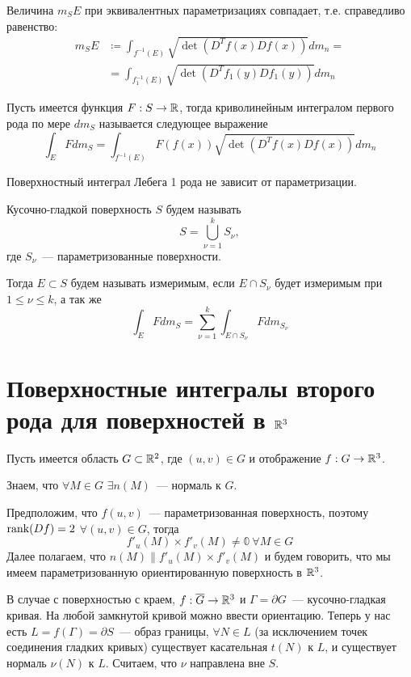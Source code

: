 \documentclass[main]{subfiles}
\begin{document}
\begin{theorem}
    Величина $m_S E$ при эквивалентных параметризациях совпадает, т.е. справедливо равенство:
    \begin{align*}
        m_S E & \coloneq \int_{f^{-1}(E)} \sqrt{\det(D^Tf(x) Df(x))} dm_n = \\
              & = \int_{f_1^{-1}(E)} \sqrt{\det(D^Tf_1(y) Df_1(y))} dm_n
    \end{align*}
\end{theorem}

\begin{definition}
    Пусть имеется функция $F: S \to \mathbb{R}$, тогда криволинейным интегралом первого рода по мере $dm_S$ называется следующее выражение
    \[\int_E F dm_S = \int_{f^{-1}(E)} F(f(x)) \sqrt{\det(D^Tf(x) Df(x))} dm_n\]
\end{definition}
\begin{theorem}
    Поверхностный интеграл Лебега 1 рода не зависит от параметризации.
\end{theorem}

\begin{definition}
    Кусочно-гладкой поверхность $S$ будем называть
    \[S = \bigcup_{\nu = 1}^k S_\nu,\]
    где $S_\nu$~--- параметризованные поверхности.

    Тогда $E \subset S$ будем называть измеримым, если $E \cap S_\nu$ будет измеримым при $1 \le \nu \le k$, а так же
    \[\int_E F dm_S = \sum_{\nu = 1}^{k} \int_{E \cap S_\nu} F dm_{S_\nu}\]
\end{definition}

\section{Поверхностные интегралы второго рода для поверхностей в \texorpdfstring{$\mathbb{R}^3$}{R\textasciicircum 3}}
\begin{definition}
    Пусть имеется область $G \subset \mathbb{R}^2$, где $(u, v) \in G$ и отображение $f: G \to \mathbb{R}^3$.

    Знаем, что $\forall M \in G$ $\exists n(M)$~--- нормаль к $G$.

    Предположим, что $f(u, v)$~--- параметризованная поверхность, поэтому $\operatorname{rank}(Df) = 2$ $\forall (u, v) \in G$, тогда
    \[f'_u(M) \times f'_v(M) \neq \mathbb{0}\ \forall M \in G\]
    Далее полагаем, что $n(M) \parallel f'_u(M) \times f'_v(M)$ и будем говорить, что мы имеем параметризованную ориентированную поверхность в $\mathbb{R}^3$.
\end{definition}
В случае с поверхностью с краем, $f: \overline{G} \to \mathbb{R}^3$ и $\Gamma = \partial G$~--- кусочно-гладкая кривая.
На любой замкнутой кривой можно ввести ориентацию.
Теперь у нас есть $L = f(\Gamma) = \partial S$~--- образ границы, $\forall N \in L$ (за исключением точек соединения гладких кривых) существует касательная $t(N)$ к $L$, и существует нормаль $\nu(N)$ к $L$.
Считаем, что $\nu$ направлена вне $S$.
\end{document}
